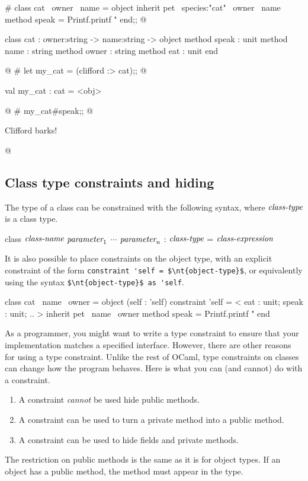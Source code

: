 \begin{ocaml}
# class cat ~owner ~name =
  object
     inherit pet ~species:"cat" ~owner ~name
     method speak = Printf.printf "%
  end;;
@
\begin{topoutput}
class cat : owner:string -> name:string ->
  object
    method speak : unit
    method name : string
    method owner : string
    method eat : unit
  end
\end{topoutput}
@
# let my_cat = (clifford :> cat);;
@
\begin{topoutput}
val my_cat : cat = <obj>
\end{topoutput}
@
# my_cat#speak;;
@
\begin{topoutput}
Clifford barks!
\end{topoutput}
@
\end{ocaml}

\subsection{Class type constraints and hiding}

The type of a class can be constrained with the following syntax, where $\textit{\rmfamily class-type}$ is a class type.

\begin{ocaml}
class $\textit{\rmfamily class-name}$ $\textit{\rmfamily parameter}_1$ $\cdots$ $\textit{\rmfamily parameter}_n$ : $\textit{\rmfamily class-type}$ = $\textit{\rmfamily class-expression}$
\end{ocaml}
%
It is also possible to place constraints on the object type, with an explicit constraint of the form
\hbox{\lstinline/constraint 'self = $\nt{object-type}$/},
or equivalently using the syntax \hbox{\lstinline/$\nt{object-type}$ as 'self/}.

\begin{ocaml}
class cat ~name ~owner =
object (self : 'self)
   constraint 'self = < eat : unit; speak : unit; .. >
   inherit pet ~name ~owner
   method speak = Printf.printf "%
end
\end{ocaml}
%
As a programmer, you might want to write a type constraint to ensure that your implementation
matches a specified interface.  However, there are other reasons for using a type constraint.
Unlike the rest of OCaml, type constraints on classes can change how the program behaves.
Here is what you can (and cannot) do with a constraint.

\begin{enumerate}
\item A constraint \emph{cannot} be used hide public methods.
\item A constraint can be used to turn a private method into a public method.
\item A constraint can be used to hide fields and private methods.
\end{enumerate}
%
The restriction on public methods is the same as it is for object types.
If an object has a public method, the method must appear in the type.

